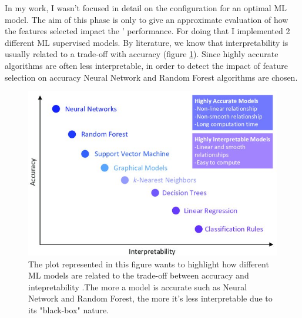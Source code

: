 In my work, I wasn't focused in detail on the configuration for an optimal ML model. The aim of this phase is only to give an approximate evaluation of how the features selected impact the ' performance. 
For doing that I implemented 2 different ML supervised models.
By literature, we know that interpretability is usually related to a trade-off with accuracy (figure \ref{fig:trade-off}).
Since highly accurate algorithms are often less interpretable, in order to detect the impact of feature selection on accuracy Neural Network and Random Forest algorithms are chosen. 
\begin{figure}[H]
    \centering
    \includegraphics[scale=1.4]{images/interpretability_accuracy_tradeoff.jpg}
    \caption{The plot represented in this figure wants to highlight how different ML models are related to the trade-off between accuracy and intepretability \cite{morocho2019machine}.The more a model is accurate such as Neural Network and Random Forest, the more it's less interpretable due to its "black-box" nature.}
    \label{fig:trade-off}
\end{figure}
